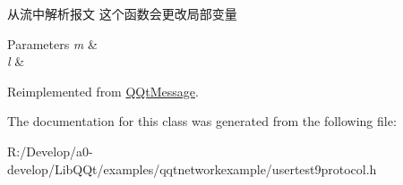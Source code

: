 从流中解析报文 这个函数会更改局部变量 


\begin{DoxyParams}{Parameters}
{\em m} & \\
\hline
{\em l} & \\
\hline
\end{DoxyParams}


Reimplemented from \mbox{\hyperlink{class_q_qt_message_a0bc25669bdd61490b1d8df6d77565f31}{Q\+Qt\+Message}}.



The documentation for this class was generated from the following file\+:\begin{DoxyCompactItemize}
\item 
R\+:/\+Develop/a0-\/develop/\+Lib\+Q\+Qt/examples/qqtnetworkexample/usertest9protocol.\+h\end{DoxyCompactItemize}
